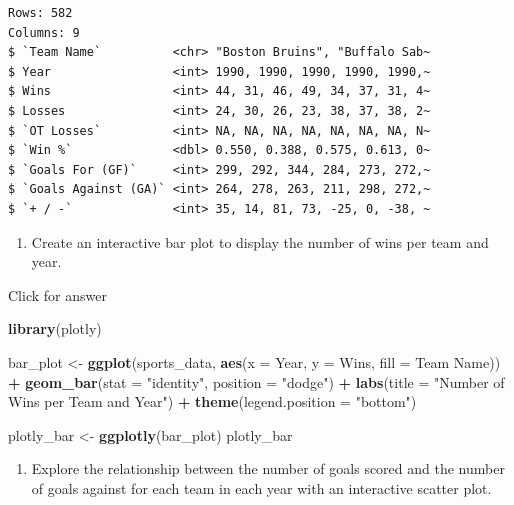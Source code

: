 \documentclass[
]{book}
\newenvironment{Shaded}{\begin{snugshade}}{\end{snugshade}}
\newcommand{\AttributeTok}[1]{\textcolor[rgb]{0.13,0.29,0.53}{#1}}
\newcommand{\FunctionTok}[1]{\textcolor[rgb]{0.13,0.29,0.53}{\textbf{#1}}}
\newcommand{\NormalTok}[1]{#1}
\newcommand{\OtherTok}[1]{\textcolor[rgb]{0.56,0.35,0.01}{#1}}
\newcommand{\SpecialCharTok}[1]{\textcolor[rgb]{0.81,0.36,0.00}{\textbf{#1}}}
\newcommand{\StringTok}[1]{\textcolor[rgb]{0.31,0.60,0.02}{#1}}
\providecommand{\tightlist}{%
  \setlength{\itemsep}{0pt}\setlength{\parskip}{0pt}}
\begin{document}
\begin{verbatim}
Rows: 582
Columns: 9
$ `Team Name`          <chr> "Boston Bruins", "Buffalo Sab~
$ Year                 <int> 1990, 1990, 1990, 1990, 1990,~
$ Wins                 <int> 44, 31, 46, 49, 34, 37, 31, 4~
$ Losses               <int> 24, 30, 26, 23, 38, 37, 38, 2~
$ `OT Losses`          <int> NA, NA, NA, NA, NA, NA, NA, N~
$ `Win %`              <dbl> 0.550, 0.388, 0.575, 0.613, 0~
$ `Goals For (GF)`     <int> 299, 292, 344, 284, 273, 272,~
$ `Goals Against (GA)` <int> 264, 278, 263, 211, 298, 272,~
$ `+ / -`              <int> 35, 14, 81, 73, -25, 0, -38, ~
\end{verbatim}

\begin{enumerate}
\def\labelenumi{\arabic{enumi}.}
\setcounter{enumi}{3}
\tightlist
\item
  Create an interactive bar plot to display the number of wins per team and year.
\end{enumerate}

Click for answer

\begin{Shaded}
\begin{Highlighting}[]
\FunctionTok{library}\NormalTok{(plotly)}

\NormalTok{bar\_plot }\OtherTok{\textless{}{-}} \FunctionTok{ggplot}\NormalTok{(sports\_data, }\FunctionTok{aes}\NormalTok{(}\AttributeTok{x =}\NormalTok{ Year, }\AttributeTok{y =}\NormalTok{ Wins, }\AttributeTok{fill =} \StringTok{\textasciigrave{}}\AttributeTok{Team Name}\StringTok{\textasciigrave{}}\NormalTok{)) }\SpecialCharTok{+}
  \FunctionTok{geom\_bar}\NormalTok{(}\AttributeTok{stat =} \StringTok{"identity"}\NormalTok{, }\AttributeTok{position =} \StringTok{"dodge"}\NormalTok{) }\SpecialCharTok{+}
  \FunctionTok{labs}\NormalTok{(}\AttributeTok{title =} \StringTok{"Number of Wins per Team and Year"}\NormalTok{) }\SpecialCharTok{+}
  \FunctionTok{theme}\NormalTok{(}\AttributeTok{legend.position =} \StringTok{"bottom"}\NormalTok{)}

\NormalTok{plotly\_bar }\OtherTok{\textless{}{-}} \FunctionTok{ggplotly}\NormalTok{(bar\_plot)}
\NormalTok{plotly\_bar}
\end{Highlighting}
\end{Shaded}

\begin{enumerate}
\def\labelenumi{\arabic{enumi}.}
\setcounter{enumi}{4}
\tightlist
\item
  Explore the relationship between the number of goals scored and the number of goals against for each team in each year with an interactive scatter plot.
\end{enumerate}
\end{document}

